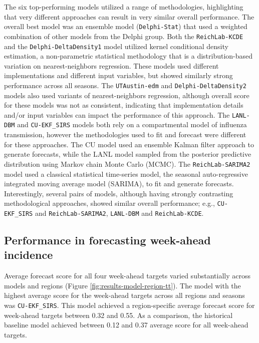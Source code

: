 \documentclass{article}\usepackage[]{graphicx}\usepackage[]{color}
\begin{document}
The six top-performing models utilized a range of methodologies, highlighting that very different approaches can result in very similar overall performance. 
The overall best model was an ensemble model ({\tt Delphi-Stat}) that used a weighted combination of other models from the Delphi group.
Both the {\tt ReichLab-KCDE} and the {\tt Delphi-DeltaDensity1} model utilized kernel conditional density estimation, a non-parametric statistical methodology that is a distribution-based variation on nearest-neighbors regression. 
These models used different implementations and different input variables, but showed similarly strong performance across all seasons.
The {\tt UTAustin-edm} and {\tt Delphi-DeltaDensity2} models also used variants of nearest-neighbors regression, although overall score for these models was not as consistent, indicating that implementation details and/or input variables can impact the performance of this approach.
The {\tt LANL-DBM} and {\tt CU-EKF\_SIRS} models both rely on a compartmental model of influenza transmission, however the methodologies used to fit and forecast were different for these approaches.
The CU model used an ensemble Kalman filter approach to generate forecasts, while the LANL model sampled from the posterior predictive distribution using Markov chain Monte Carlo (MCMC).
The {\tt ReichLab-SARIMA2} model used a classical statistical time-series model, the seasonal auto-regressive integrated moving average model (SARIMA), to fit and generate forecasts. 
Interestingly, several pairs of models, although having strongly contrasting methodological approaches, showed similar overall performance; e.g., {\tt CU-EKF\_SIRS} and {\tt ReichLab-SARIMA2}, {\tt LANL-DBM} and {\tt ReichLab-KCDE}.

\subsection{Performance in forecasting week-ahead incidence}


Average forecast score for all four week-ahead targets varied substantially across models and regions (Figure \ref{fig:results-model-region-tt}).
The model with the highest average score for the week-ahead targets across all regions and seasons was {\tt CU-EKF\_SIRS}.
This model achieved a region-specific average forecast score for week-ahead targets between
0.32 
and 
0.55.
As a comparison, the historical baseline model achieved between
0.12 and
0.37
average score for all week-ahead targets.
\end{document}
